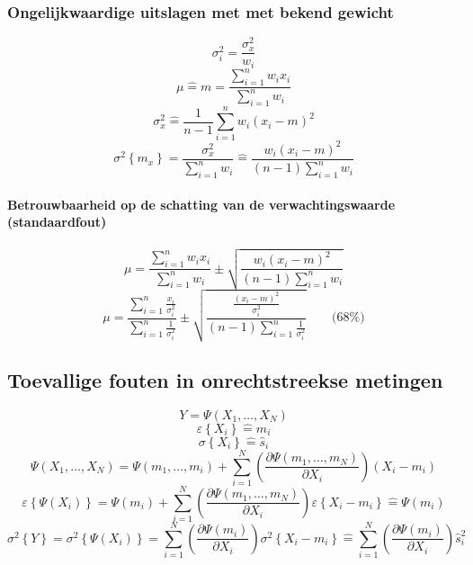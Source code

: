     \subsubsection{Ongelijkwaardige uitslagen met met bekend gewicht}
    \label{sec:SteekproeftheorieONGeljkwaardigeUitslagenGewicht}
      \[
        \sigma_i^2 = \frac{\sigma_x^2}{w_i}
      \]
      \[
        \mu \hat{=} m = \frac{\sum_{i=1}^n w_i x_i}{\sum_{i=1}^n w_i}
      \]
      \[
        \sigma_x^2 \hat{=} \frac{1}{n-1}\sum_{i=1}^n w_i\left(x_i-m\right)^2
      \]
      \[
        \sigma^2\left\{m_x\right\} = \frac{\sigma_x^2}{\sum_{i=1}^n w_i}
                              \hat{=} \frac{w_i\left(x_i-m\right)^2}{\left(n-1\right) \sum_{i=1}^n w_i} 
      \]
      \paragraph{Betrouwbaarheid op de schatting van de verwachtingswaarde (standaardfout)}
      \[
        \mu = \frac{\sum_{i=1}^n w_i x_i}{\sum_{i=1}^n w_i} \pm \sqrt{\frac{w_i\left(x_i-m\right)^2}{\left(n-1\right) \sum_{i=1}^n w_i}}
      \]
      \[
        \mu = \frac{\sum_{i=1}^n\frac{x_i}{\sigma_i^2}}{\sum_{i=1}^n\frac{1}{\sigma_i^2}}
              \pm
              \sqrt{\frac{\frac{\left(x_i-m\right)^2}{\sigma_i^2}}{\left(n-1\right) \sum_{i=1}^n \frac{1}{\sigma_i^2}}}
              \qquad \mbox{(68\%)}
      \]
    
  \subsection{Toevallige fouten in onrechtstreekse metingen}
  \label{sec:ToevFoutenOnrechtstreeksMeting}
    \[
      Y = \Psi\left(X_1, \ldots , X_N\right)
    \]  
    \[
      \varepsilon\left\{X_i\right\} \hat{=} m_i
    \]
    \[
      \sigma\left\{X_i\right\} \hat{=} \hat{s}_i
    \]
    \[
      \Psi\left(X_1, \ldots , X_N\right) = \Psi\left(m_1, \ldots, m_i\right)
                                           +
                                           \sum_{i=1}^N \left(\frac{\partial \Psi\left(m_1, \dots, m_N\right)}{\partial X_i}\right)
                                           \left(X_i-m_i\right)
    \]
    \[
      \varepsilon\left\{\Psi\left(X_i\right)\right\} = \Psi\left(m_i\right) 
                                                     + \sum_{i=1}^N \left(\frac{\partial \Psi\left(m_1, \dots, m_N\right)}{\partial X_i}\right)
                                                    \varepsilon \left\{X_i-m_i\right\}
                                                \hat{=} \Psi\left(m_i\right)
    \]
    \[
      \sigma^2\left\{Y\right\} = \sigma^2\left\{\Psi\left(X_i\right)\right\}
                               = \sum_{i=1}^N \left(\frac{\partial \Psi\left(m_i\right)}{\partial X_i}\right)
                                 \sigma^2\left\{X_i-m_i\right\}
                          \hat{=}\sum_{i=1}^N \left(\frac{\partial \Psi\left(m_i\right)}{\partial X_i}\right)
                                 \hat{s}_i^2
    \]
    
